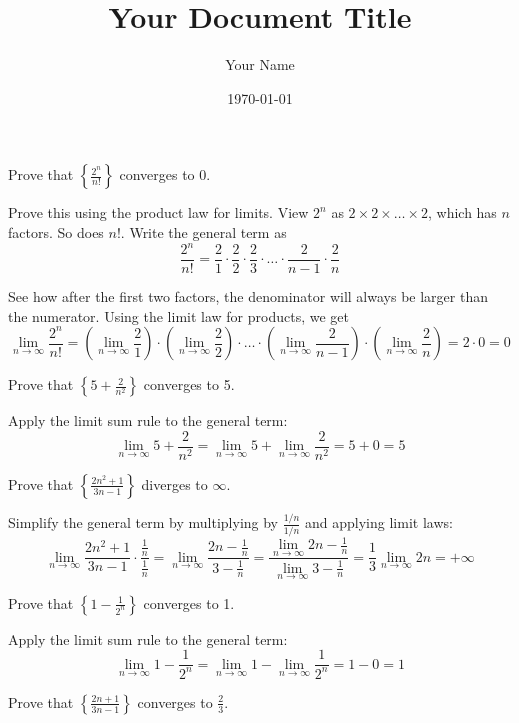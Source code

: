 \documentclass{article}
\title{Your Document Title}
\author{Your Name}
\date{\today} %
\begin{document}
\maketitle
\begin{problem}
Prove that $\left\{ \frac{2^n}{n!} \right\}$ converges to 0.
\end{problem}

Prove this using the product law for limits. View $2^n$ as $2 \times 2 \times \ldots \times 2$, which has $n$ factors. So does $n!$. Write the general term as
$$\frac{2^n}{n!} = \frac{2}{1} \cdot \frac{2}{2} \cdot \frac{2}{3} \cdot \ldots \cdot \frac{2}{n-1} \cdot \frac{2}{n}$$

See how after the first two factors, the denominator will always be larger than the numerator. Using the limit law for products, we get
$$\lim_{n\to\infty}\frac{2^n}{n!} = \left(\lim_{n\to\infty}\frac{2}{1}\right) \cdot \left(\lim_{n\to\infty}\frac{2}{2}\right) \cdot \ldots \cdot \left(\lim_{n\to\infty} \frac{2}{n-1}\right) \cdot \left(\lim_{n\to\infty}\frac{2}{n}\right) = 2 \cdot 0 = 0$$

\begin{problem}
Prove that $\left\{5 + \frac{2}{n^2}\right\}$ converges to 5.
\end{problem}

Apply the limit sum rule to the general term:
$$\lim_{n\to\infty} 5 + \frac{2}{n^2} = \lim_{n\to\infty} 5 + \lim_{n\to\infty} \frac{2}{n^2} = 5 + 0 = 5$$

\begin{problem}
Prove that $\left\{ \frac{2n^2 + 1}{3n - 1} \right\}$ diverges to $\infty$.
\end{problem}

Simplify the general term by multiplying by $\frac{1/n}{1/n}$ and applying limit laws:
$$\lim_{n\to\infty} \frac{2n^2 + 1}{3n - 1}\cdot \frac{ \frac{1}{n}}{\frac{1}{n}} = \lim_{n\to\infty} \frac{2n - \frac{1}{n}}{3 - \frac{1}{n}} = \frac{\lim\limits_{n\to\infty}2n - \frac{1}{n}}{\lim\limits_{n\to\infty} 3 - \frac{1}{n}} = \frac{1}{3}\lim_{n\to\infty} 2n = +\infty$$

\begin{problem}
Prove that $\left\{ 1 - \frac{1}{2^n} \right\}$ converges to 1.
\end{problem}

Apply the limit sum rule to the general term:
$$\lim_{n\to\infty} 1 - \frac{1}{2^n} = \lim_{n\to\infty} 1 - \lim_{n\to\infty} \frac{1}{2^n} = 1 - 0 = 1$$

\begin{problem}
Prove that $\left\{ \frac{2n + 1}{3n - 1} \right\}$ converges to $\frac{2}{3}$.
\end{problem}
\end{document}
